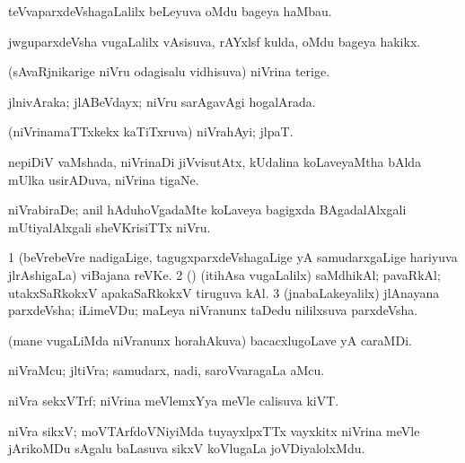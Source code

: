 {\bentry
{} 
\gl{\nA}
\expl{}
\bmng
teVvaparxdeVshagaLalilx beLeyuva oMdu bageya haMbau. 
\emng
\eentry

\bentry
{} 
\gl{\nA}
\expl{}
\bmng
jwguparxdeVsha \mo vugaLalilx vAsisuva, rAYxlsf kulda, oMdu bageya hakikx. 
\emng
\eentry

\bentry
{} 
\gl{\nA}
\expl{}
\bmng
{} 
\emng
\eentry

\bentry
{} 
\gl{\nA}
\expl{}
\bmng
(sAvaRjnikarige niVru odagisalu vidhisuva) niVrina terige. 
\emng
\eentry

\bentry
{} 
\gl{\gu}
\expl{}
\bmng
jlnivAraka; jlABeVdayx; niVru sarAgavAgi hogalArada. 
\emng
\eentry

\bentry
{} 
\gl{\nA}
\expl{}
\bmng
(niVrinamaTTxkekx kaTiTxruva) niVrahAyi; jlpaT. 
\emng
\eentry

\bentry
{} 
\gl{\nA}
\expl{}
\bmng
nepiDiV vaMshada, niVrinaDi jiVvisutAtx, kUdalina koLaveyaMtha bAlda mUlka usirADuva, niVrina tigaNe. 
\emng
\eentry

\bentry
{} 
\gl{\nA}
\expl{}
\bmng
niVrabiraDe; anil hAduhoVgadaMte koLaveya bagigxda BAgadalAlxgali mUtiyalAlxgali sheVKrisiTTx niVru. 
\emng
\eentry

\bentry
{} 
\gl{\nA}
\expl{}
\bmng
\bnum
\num{1} (beVrebeVre nadigaLige, tagugxparxdeVshagaLige yA samudarxgaLige hariyuva jlrAshigaLa) viBajana reVKe. 
\num{2} (\rUpa) (itihAsa \mo vugaLalilx) saMdhikAl; pavaRkAl; utakxSaRkokxV apakaSaRkokxV tiruguva kAl. 
\num{3} (jnabaLakeyalilx) jlAnayana parxdeVsha; iLimeVDu; maLeya niVranunx taDedu nililxsuva parxdeVsha. 
\enum
\emng
\eentry

\bentry
{} 
\gl{\nA}
\expl{}
\bmng
(mane \mo vugaLiMda niVranunx horahAkuva) bacacxlugoLave yA caraMDi. 
\emng
\eentry

\bentry
{} 
\gl{\nA}
\expl{}
\bmng
niVraMcu; jltiVra; samudarx, nadi, saroVvaragaLa aMcu. 
\emng
\eentry

\bentry
{} 
\gl{\nA}
\expl{}
\bmng
niVra sekxVTrf; niVrina meVlemxYya meVle calisuva kiVT. 
\emng
\eentry

\bentry
{} 
\gl{\nA}
\bmng
niVra sikxV; moVTArfdoVNiyiMda tuyayxlpxTTx vayxkitx niVrina meVle jArikoMDu sAgalu baLasuva sikxV koVlugaLa joVDiyalolxMdu. 
\emng
\eentry

}
